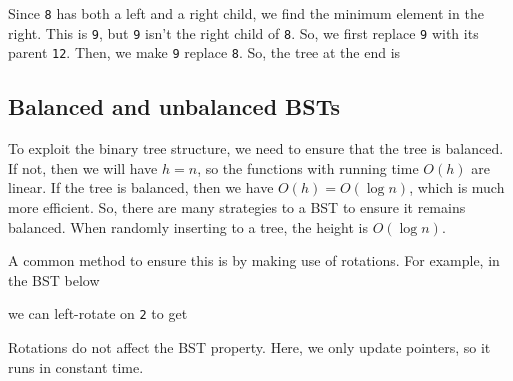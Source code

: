 \documentclass[a4paper, openany]{memoir}
\begin{document}
Since \texttt{8} has both a left and a right child, we find the minimum element in the right. This is \texttt{9}, but \texttt{9} isn't the right child of \texttt{8}. So, we first replace \texttt{9} with its parent \texttt{12}. Then, we make \texttt{9} replace \texttt{8}. So, the tree at the end is
\begin{center}
\end{center}

\subsection{Balanced and unbalanced BSTs}
To exploit the binary tree structure, we need to ensure that the tree is balanced. If not, then we will have $h = n$, so the functions with running time $O(h)$ are linear. If the tree is balanced, then we have $O(h) = O(\log n)$, which is much more efficient. So, there are many strategies to a BST to ensure it remains balanced. When randomly inserting to a tree, the height is $O(\log n)$.

\noindent A common method to ensure this is by making use of rotations. For example, in the BST below
\begin{center}
\end{center}
we can left-rotate on \texttt{2} to get
\begin{center}
\end{center}
Rotations do not affect the BST property. Here, we only update pointers, so it runs in constant time.
\end{document}
